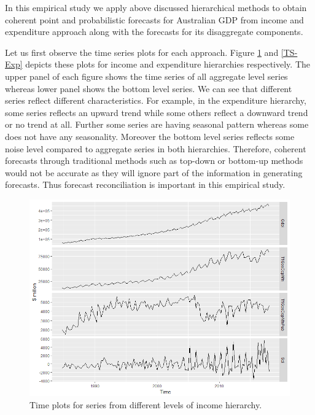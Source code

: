\documentclass[graybox]{svmult}
\begin{document}
In this empirical study we apply above discussed hierarchical methods to obtain coherent point and probabilistic forecasts for Australian GDP from income and expenditure approach along with the forecasts for its disaggregate components.


Let us first observe the time series plots for each approach. Figure \ref{TS-Inc} and \ref{TS-Exp} depicts these plots for income and expenditure hierarchies respectively. The upper panel of each figure shows the time series of all aggregate level series whereas lower panel shows the bottom level series. We can see that different series reflect different characteristics. For example, in the expenditure hierarchy, some series reflects an upward trend while some others reflect a downward trend or no trend at all. Further some series are having seasonal pattern whereas some does not have any seasonality. Moreover the bottom level series reflects some noise level compared to aggregate series in both hierarchies. Therefore, coherent forecasts through traditional methods such as top-down or bottom-up methods would not be accurate as they will ignore part of the information in generating forecasts. Thus forecast reconciliation is important in this empirical study.

\begin{figure}[H]
	\centering
	\small
	\includegraphics[scale=0.50]{Figs/TS-plots/INC-hierarchy/INC-char-of-levels-TSplots.png}
	\caption{Time plots for series from different levels of income hierarchy.}\label{TS-Inc}
\end{figure}
\end{document}
